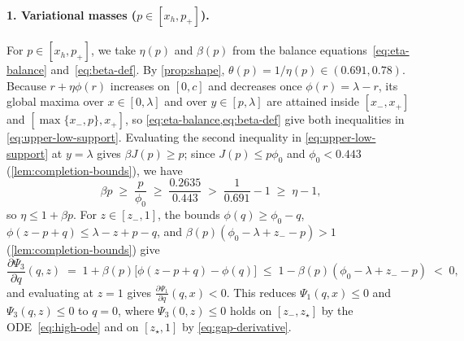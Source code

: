 \documentclass[11pt]{article}
\numberwithin{equation}{section}
\theoremstyle{plain}
\theoremstyle{definition}
\newcommand{\1}{\mathbf{1}}
\begin{document}
\paragraph{1. Variational masses ($p \in [x_h, p_+]$).}
For $p \in [x_h, p_+]$, we take $\eta(p)$ and $\beta(p)$ from the balance equations~\eqref{eq:eta-balance} and~\eqref{eq:beta-def}. By \cref{prop:shape}, $\theta(p) = 1/\eta(p) \in (0.691, 0.78)$. Because $r + \eta\phi(r)$ increases on $[0, c]$ and decreases once $\phi(r) = \lambda - r$, its global maxima over $x \in [0, \lambda]$ and over $y \in [p, \lambda]$ are attained inside $[x_-, x_+]$ and $[\max\{x_-, p\}, x_+]$, so \cref{eq:eta-balance,eq:beta-def} give both inequalities in \cref{eq:upper-low-support}. Evaluating the second inequality in \cref{eq:upper-low-support} at $y = \lambda$ gives $\beta J(p) \ge p$; since $J(p) \le p\phi_0$ and $\phi_0 < 0.443$ (\cref{lem:completion-bounds}), we have
\[
  \beta p \;\ge\; \frac{p}{\phi_0} \;\ge\; \frac{0.2635}{0.443} \;>\; \frac{1}{0.691} - 1 \;\ge\; \eta - 1,
\]
so $\eta \le 1 + \beta p$. For $z \in [z_-, 1]$, the bounds $\phi(q) \ge \phi_0 - q$, $\phi(z - p + q) \le \lambda - z + p - q$, and $\beta(p)(\phi_0 - \lambda + z_- - p) > 1$ (\cref{lem:completion-bounds}) give
\[
  \frac{\partial \Psi_3}{\partial q}(q, z) \;=\; 1 + \beta(p)\bigl[\phi(z - p + q) - \phi(q)\bigr] \;\le\; 1 - \beta(p)(\phi_0 - \lambda + z_- - p) \;<\; 0,
\]
and evaluating at $z = 1$ gives $\frac{\partial \Psi_1}{\partial q}(q, x) < 0$. This reduces $\Psi_1(q, x) \le 0$ and $\Psi_3(q, z) \le 0$ to $q = 0$, where $\Psi_3(0, z) \le 0$ holds on $[z_-, z_\star]$ by the ODE~\eqref{eq:high-ode} and on $[z_\star, 1]$ by \cref{eq:gap-derivative}.
\end{document}
